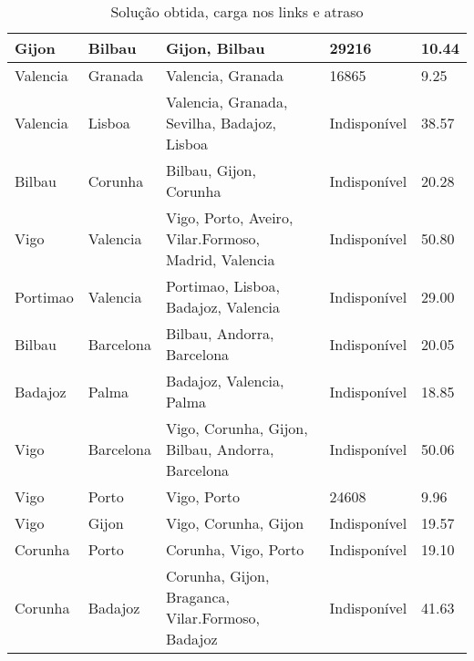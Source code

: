 \begin{table}[!htb]
{\begin{tabular}{|l|l|l|l|l|}
Gijon & Bilbau & Gijon, Bilbau & 29216 & 10.44 \\ \hline
Valencia & Granada & Valencia, Granada & 16865 & 9.25 \\ \hline
Valencia & Lisboa & Valencia, Granada, Sevilha, Badajoz, Lisboa & Indisponível & 38.57 \\ \hline
Bilbau & Corunha & Bilbau, Gijon, Corunha & Indisponível & 20.28 \\ \hline
Vigo & Valencia & Vigo, Porto, Aveiro, Vilar.Formoso, Madrid, Valencia & Indisponível & 50.80 \\ \hline
Portimao & Valencia & Portimao, Lisboa, Badajoz, Valencia & Indisponível & 29.00 \\ \hline
Bilbau & Barcelona & Bilbau, Andorra, Barcelona & Indisponível & 20.05 \\ \hline
Badajoz & Palma & Badajoz, Valencia, Palma & Indisponível & 18.85 \\ \hline
Vigo & Barcelona & Vigo, Corunha, Gijon, Bilbau, Andorra, Barcelona & Indisponível & 50.06 \\ \hline
Vigo & Porto & Vigo, Porto & 24608 & 9.96 \\ \hline
Vigo & Gijon & Vigo, Corunha, Gijon & Indisponível & 19.57 \\ \hline
Corunha & Porto & Corunha, Vigo, Porto & Indisponível & 19.10 \\ \hline
Corunha & Badajoz & Corunha, Gijon, Braganca, Vilar.Formoso, Badajoz & Indisponível & 41.63 \\ \hline
\end{tabular}}
\caption[]{Solução obtida, carga nos links e atraso}
\end{table}

